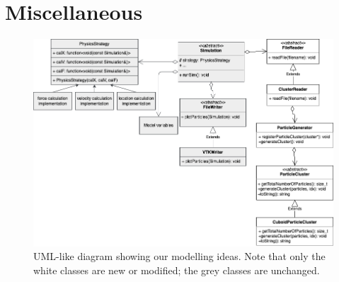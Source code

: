 \documentclass{article}
\begin{document}
\section{Miscellaneous}

\begin{figure}[H]
    \includegraphics[width=\textwidth]{res/UML.png}
    \caption{UML-like diagram showing our modelling ideas. Note that only the white classes are new or modified; the grey classes are unchanged.}
    \label{fig:UML}
\end{figure}
\end{document}
